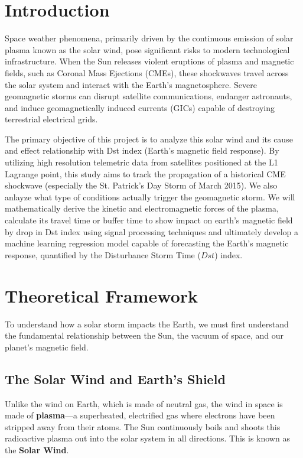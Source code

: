 \documentclass[12pt]{article}
\begin{document}
\newpage


\tableofcontents
\newpage

\section{Introduction}
Space weather phenomena, primarily driven by the continuous emission of solar plasma known as the solar wind, pose significant risks to modern technological infrastructure. When the Sun releases violent eruptions of plasma and magnetic fields, such as Coronal Mass Ejections (CMEs), these shockwaves travel across the solar system and interact with the Earth's magnetosphere. Severe geomagnetic storms can disrupt satellite communications, endanger astronauts, and induce geomagnetically induced currents (GICs) capable of destroying terrestrial electrical grids.

The primary objective of this project is to analyze this solar wind and its cause and effect relationship with Dst index (Earth's magnetic field response). By utilizing high resolution telemetric data from satellites positioned at the L1 Lagrange point, this study aims to track the propagation of a historical CME shockwave (especially  the St. Patrick's Day Storm of March 2015). We also anlayze what type of conditions actually trigger the geomagnetic storm. We will mathematically derive the kinetic and electromagnetic forces of the plasma, calculate its travel time or buffer time to show impact on earth's magnetic field by drop in Dst index using signal processing techniques and ultimately develop a machine learning regression model capable of forecasting the Earth's magnetic response, quantified by the Disturbance Storm Time ($Dst$) index.

\section{Theoretical Framework}

To understand how a solar storm impacts the Earth, we must first understand the fundamental relationship between the Sun, the vacuum of space, and our planet's magnetic field.

\subsection{The Solar Wind and Earth's Shield}
Unlike the wind on Earth, which is made of neutral gas, the wind in space is made of \textbf{plasma}—a superheated, electrified gas where electrons have been stripped away from their atoms. The Sun continuously boils and shoots this radioactive plasma out into the solar system in all directions. This is known as the \textbf{Solar Wind}. 
\end{document}
